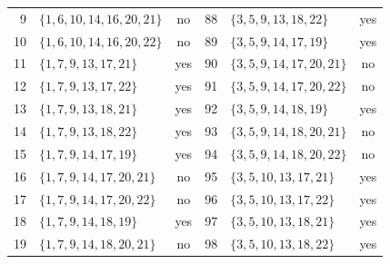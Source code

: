 \documentclass[aps,pra,reprint,superscriptaddress,longbibliography,nofootinbib,floatfix,10pt]{revtex4-2}
\theoremstyle{definition}
\begin{document}
\begin{longtable}{rlc@{\qquad}rlc}
9 & $\{1,\allowbreak 6,\allowbreak 10,\allowbreak 14,\allowbreak 16,\allowbreak 20,\allowbreak 21\}$ & no & 88 & $\{3,\allowbreak 5,\allowbreak 9,\allowbreak 13,\allowbreak 18,\allowbreak 22\}$ & yes\\
10 & $\{1,\allowbreak 6,\allowbreak 10,\allowbreak 14,\allowbreak 16,\allowbreak 20,\allowbreak 22\}$ & no & 89 & $\{3,\allowbreak 5,\allowbreak 9,\allowbreak 14,\allowbreak 17,\allowbreak 19\}$ & yes\\
11 & $\{1,\allowbreak 7,\allowbreak 9,\allowbreak 13,\allowbreak 17,\allowbreak 21\}$ & yes & 90 & $\{3,\allowbreak 5,\allowbreak 9,\allowbreak 14,\allowbreak 17,\allowbreak 20,\allowbreak 21\}$ & no\\
12 & $\{1,\allowbreak 7,\allowbreak 9,\allowbreak 13,\allowbreak 17,\allowbreak 22\}$ & yes & 91 & $\{3,\allowbreak 5,\allowbreak 9,\allowbreak 14,\allowbreak 17,\allowbreak 20,\allowbreak 22\}$ & no\\
13 & $\{1,\allowbreak 7,\allowbreak 9,\allowbreak 13,\allowbreak 18,\allowbreak 21\}$ & yes & 92 & $\{3,\allowbreak 5,\allowbreak 9,\allowbreak 14,\allowbreak 18,\allowbreak 19\}$ & yes\\
14 & $\{1,\allowbreak 7,\allowbreak 9,\allowbreak 13,\allowbreak 18,\allowbreak 22\}$ & yes & 93 & $\{3,\allowbreak 5,\allowbreak 9,\allowbreak 14,\allowbreak 18,\allowbreak 20,\allowbreak 21\}$ & no\\
15 & $\{1,\allowbreak 7,\allowbreak 9,\allowbreak 14,\allowbreak 17,\allowbreak 19\}$ & yes & 94 & $\{3,\allowbreak 5,\allowbreak 9,\allowbreak 14,\allowbreak 18,\allowbreak 20,\allowbreak 22\}$ & no\\
16 & $\{1,\allowbreak 7,\allowbreak 9,\allowbreak 14,\allowbreak 17,\allowbreak 20,\allowbreak 21\}$ & no & 95 & $\{3,\allowbreak 5,\allowbreak 10,\allowbreak 13,\allowbreak 17,\allowbreak 21\}$ & yes\\
17 & $\{1,\allowbreak 7,\allowbreak 9,\allowbreak 14,\allowbreak 17,\allowbreak 20,\allowbreak 22\}$ & no & 96 & $\{3,\allowbreak 5,\allowbreak 10,\allowbreak 13,\allowbreak 17,\allowbreak 22\}$ & yes\\
18 & $\{1,\allowbreak 7,\allowbreak 9,\allowbreak 14,\allowbreak 18,\allowbreak 19\}$ & yes & 97 & $\{3,\allowbreak 5,\allowbreak 10,\allowbreak 13,\allowbreak 18,\allowbreak 21\}$ & yes\\
19 & $\{1,\allowbreak 7,\allowbreak 9,\allowbreak 14,\allowbreak 18,\allowbreak 20,\allowbreak 21\}$ & no & 98 & $\{3,\allowbreak 5,\allowbreak 10,\allowbreak 13,\allowbreak 18,\allowbreak 22\}$ & yes\\

\end{longtable}
\end{document}

